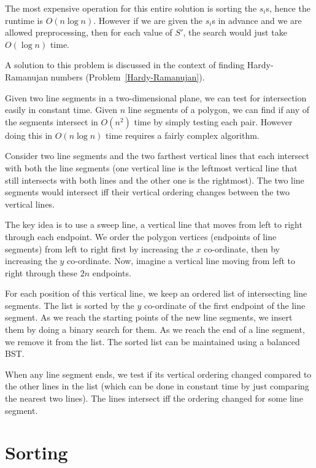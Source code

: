 The most expensive operation for this entire solution is sorting the $s_i$s,
hence the runtime is $O(n \log n)$. However if we are given the $s_i$s  in
advance and we are allowed preprocessing, then for each value of $S'$,
the search would just take $O(\log n)$ time.

A solution to this problem is discussed in the context of finding Hardy-Ramanujan numbers (Problem~\ref{Hardy-Ramanujan}).

Given two line segments in a two-dimensional plane, we can test for
intersection easily in constant time. Given $n$ line segments of a
polygon, we can find if any of the segments intersect in $O(n^2)$ time
by simply testing each pair. However doing this in $O(n \log n)$ time
requires a fairly complex algorithm.

Consider two line segments and the two farthest vertical lines that each intersect
with both the line segments (one vertical line is the leftmost
vertical line that still intersects with both lines and the other one
is the rightmost). The two line segments would intersect iff their vertical ordering changes between the two vertical lines.

The key idea is to use a sweep line, a vertical line that moves from
left to right through each endpoint.  We order the polygon vertices
(endpoints of line segments) from left to right first by increasing the
$x$ co-ordinate, then by increasing the $y$ co-ordinate. Now, imagine a
vertical line moving from left to right through these $2n$ endpoints.

For each position of this vertical line, we keep an ordered list of
intersecting line segments. The list is sorted by the $y$ co-ordinate of
the first endpoint of the line segment.  As we reach the starting points
of the new line segments, we insert them by doing a binary search for
them. As we reach the end of a line segment, we remove it from the
list. The sorted list can be maintained using a balanced BST.

When any line segment ends, we test if its vertical ordering changed
compared to the other lines in the list (which can be done in constant
time by just comparing the nearest two lines). The lines intersect iff the ordering changed for some line segment.

\chapter{ Sorting}

